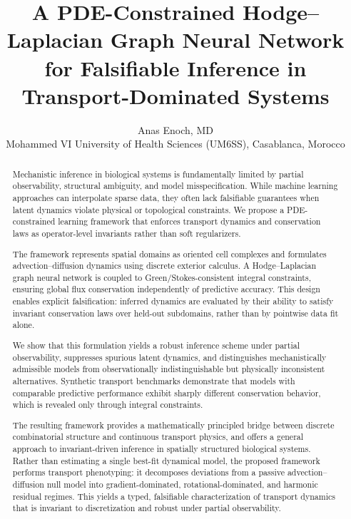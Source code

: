 \documentclass[10pt,article]{article}
\title{\textbf{A PDE-Constrained Hodge–Laplacian Graph Neural Network for Falsifiable Inference in Transport-Dominated Systems}}
\author{
Anas Enoch, MD\\
Mohammed VI University of Health Sciences (UM6SS), Casablanca, Morocco
}
\date{}
\begin{document}
\maketitle

\begin{abstract}
Mechanistic inference in biological systems is fundamentally limited by partial observability, structural ambiguity, and model misspecification. While machine learning approaches can interpolate sparse data, they often lack falsifiable guarantees when latent dynamics violate physical or topological constraints. We propose a PDE-constrained learning framework that enforces transport dynamics and conservation laws as operator-level invariants rather than soft regularizers.

The framework represents spatial domains as oriented cell complexes and formulates advection–diffusion dynamics using discrete exterior calculus. A Hodge–Laplacian graph neural network is coupled to Green/Stokes-consistent integral constraints, ensuring global flux conservation independently of predictive accuracy. This design enables explicit falsification: inferred dynamics are evaluated by their ability to satisfy invariant conservation laws over held-out subdomains, rather than by pointwise data fit alone.

We show that this formulation yields a robust inference scheme under partial observability, suppresses spurious latent dynamics, and distinguishes mechanistically admissible models from observationally indistinguishable but physically inconsistent alternatives. Synthetic transport benchmarks demonstrate that models with comparable predictive performance exhibit sharply different conservation behavior, which is revealed only through integral constraints.

The resulting framework provides a mathematically principled bridge between discrete combinatorial structure and continuous transport physics, and offers a general approach to invariant-driven inference in spatially structured biological systems. Rather than estimating a single best-fit dynamical model, the proposed framework performs transport phenotyping: it decomposes deviations from a passive advection–diffusion null model into gradient-dominated, rotational-dominated, and harmonic residual regimes. This yields a typed, falsifiable characterization of transport dynamics that is invariant to discretization and robust under partial observability.
\end{abstract}
\end{document}
